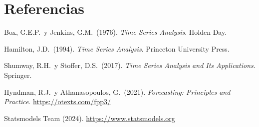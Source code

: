 \documentclass[11pt, a4paper]{article}
\begin{document}


\newpage
\section*{Referencias}
\begin{enumerate}[label={[\arabic*]}]
  \item Box, G.E.P.\ y Jenkins, G.M.\ (1976). \textit{Time Series Analysis}. Holden-Day.
  \item Hamilton, J.D.\ (1994). \textit{Time Series Analysis}. Princeton University Press.
  \item Shumway, R.H.\ y Stoffer, D.S.\ (2017). \textit{Time Series Analysis and Its Applications}. Springer.
  \item Hyndman, R.J.\ y Athanasopoulos, G.\ (2021). \textit{Forecasting: Principles and Practice}. \url{https://otexts.com/fpp3/}
  \item Statsmodels Team (2024). \url{https://www.statsmodels.org}
\end{enumerate}
\end{document}
